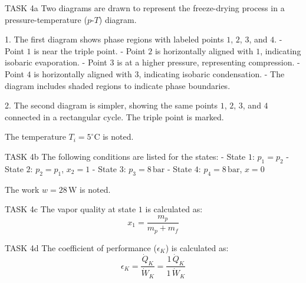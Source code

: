 TASK 4a  
Two diagrams are drawn to represent the freeze-drying process in a pressure-temperature (\( p \)-\( T \)) diagram.  

1. The first diagram shows phase regions with labeled points \( 1 \), \( 2 \), \( 3 \), and \( 4 \).  
   - Point \( 1 \) is near the triple point.  
   - Point \( 2 \) is horizontally aligned with \( 1 \), indicating isobaric evaporation.  
   - Point \( 3 \) is at a higher pressure, representing compression.  
   - Point \( 4 \) is horizontally aligned with \( 3 \), indicating isobaric condensation.  
   - The diagram includes shaded regions to indicate phase boundaries.  

2. The second diagram is simpler, showing the same points \( 1 \), \( 2 \), \( 3 \), and \( 4 \) connected in a rectangular cycle. The triple point is marked.  

The temperature \( T_i = 5^\circ\text{C} \) is noted.  

TASK 4b  
The following conditions are listed for the states:  
- State \( 1 \): \( p_1 = p_2 \)  
- State \( 2 \): \( p_2 = p_1 \), \( x_2 = 1 \)  
- State \( 3 \): \( p_3 = 8 \, \text{bar} \)  
- State \( 4 \): \( p_4 = 8 \, \text{bar} \), \( x = 0 \)  

The work \( w = 28 \, \text{W} \) is noted.  

TASK 4c  
The vapor quality at state \( 1 \) is calculated as:  
\[
x_1 = \frac{m_p}{m_p + m_f}
\]  

TASK 4d  
The coefficient of performance (\( \epsilon_K \)) is calculated as:  
\[
\epsilon_K = \frac{\dot{Q}_K}{\dot{W}_K} = \frac{1 \, \dot{Q}_K}{1 \, \dot{W}_K}
\]